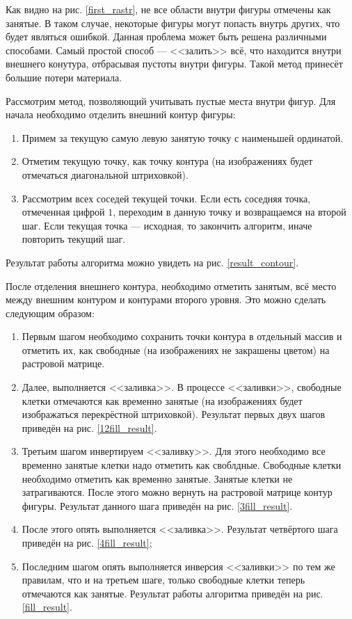 \documentclass[14pt]{extarticle}
\begin{document}
	Как видно на рис. \ref{first_rastr}, не все области внутри фигуры отмечены как занятые. В таком случае, некоторые фигуры могут попасть внутрь других, что будет являться ошибкой. Данная
	проблема может быть решена различными способами. Самый простой способ --- <<залить>> всё, что находится внутри внешнего конутура, отбрасывая пустоты внутри фигуры. Такой метод принесёт большие потери материала.


	Рассмотрим метод, позволяющий учитывать пустые места внутри фигур. Для начала необходимо отделить внешний контур фигуры:
	\begin{enumerate}
		\item Примем за текущую самую левую занятую точку с наименьшей ординатой.
		\item  Отметим текущую точку, как точку контура (на изображениях будет отмечаться диагональной штриховкой).
		\item Рассмотрим всех соседей текущей точки. Если есть соседняя точка, отмеченная цифрой $1$, переходим в данную точку и возвращаемся на второй шаг. Если текущая точка --- исходная, то закончить алгоритм, иначе повторить текущий шаг.
	\end{enumerate}


	Результат работы алгоритма можно увидеть на рис. \ref{result_contour}.
	


	После отделения внешнего контура, необходимо отметить занятым, всё место между внешним контуром и контурами второго уровня. Это можно сделать следующим образом:
	\begin{enumerate}
		\item Первым шагом необходимо сохранить точки контура в отдельный массив и отметить их, как свободные (на изображениях не закрашены цветом) на растровой матрице.
		\item Далее, выполняется <<заливка>>. В процессе <<заливки>>, свободные клетки отмечаются как временно занятые (на изображениях будет изображаться перекрёстной штриховкой). Результат первых двух шагов приведён на рис. \ref{12fill_result}.
		\item\label{3fill_step} Третьим шагом инвертируем <<заливку>>. Для этого необходимо все временно занятые клетки надо отметить как своблдные. Свободные клетки необходимо отметить как временно занятые.
		Занятые клетки не затрагиваются. После этого можно вернуть на растровой матрице контур фигуры. Результат данного шага приведён на рис. \ref{3fill_result}.
		\item После этого опять выполняется <<заливка>>. Результат четвёртого шага приведён на рис. \ref{4fill_result};
		\item Последним шагом опять выполняется инверсия <<заливки>> по тем же правилам, что и на третьем шаге, только свободные клетки теперь отмечаются как занятые. Результат работы алгоритма приведён на рис. \ref{fill_result}.
	\end{enumerate}
	\begin{multicols}{1}
		
		
	\end{multicols}
	\begin{multicols}{1}
		
		
	\end{multicols}
\end{document}
